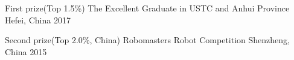 



\begin{cvhonors}

  \cvhonor
    {First prize(Top 1.5\%)} %
    {The Excellent Graduate in USTC and Anhui Province} %
    {Hefei, China} %
    {2017} %


  \cvhonor
    {Second prize(Top 2.0\%, China) } %
    {Robomasters Robot Competition} %
    {Shenzheng, China} %
    {2015} %
 



\end{cvhonors}




